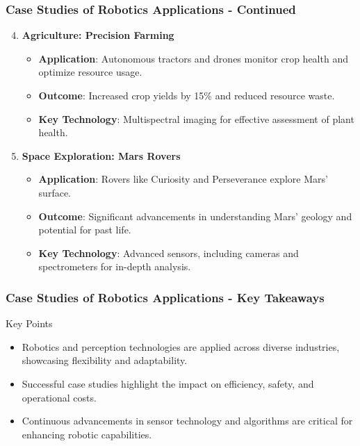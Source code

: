 \documentclass{beamer}
\begin{document}
\begin{frame}[fragile]
    \frametitle{Case Studies of Robotics Applications - Continued}
    \begin{enumerate}\setcounter{enumi}{3}
        \item \textbf{Agriculture: Precision Farming}
            \begin{itemize}
                \item \textbf{Application}: Autonomous tractors and drones monitor crop health and optimize resource usage.
                \item \textbf{Outcome}: Increased crop yields by 15\% and reduced resource waste.
                \item \textbf{Key Technology}: Multispectral imaging for effective assessment of plant health.
            \end{itemize}
        
        \item \textbf{Space Exploration: Mars Rovers}
            \begin{itemize}
                \item \textbf{Application}: Rovers like Curiosity and Perseverance explore Mars' surface.
                \item \textbf{Outcome}: Significant advancements in understanding Mars' geology and potential for past life.
                \item \textbf{Key Technology}: Advanced sensors, including cameras and spectrometers for in-depth analysis.
            \end{itemize}
    \end{enumerate}
\end{frame}

\begin{frame}[fragile]
    \frametitle{Case Studies of Robotics Applications - Key Takeaways}
    \begin{block}{Key Points}
        \begin{itemize}
            \item Robotics and perception technologies are applied across diverse industries, showcasing flexibility and adaptability.
            \item Successful case studies highlight the impact on efficiency, safety, and operational costs.
            \item Continuous advancements in sensor technology and algorithms are critical for enhancing robotic capabilities.
        \end{itemize}
    \end{block}
\end{frame}
\end{document}
